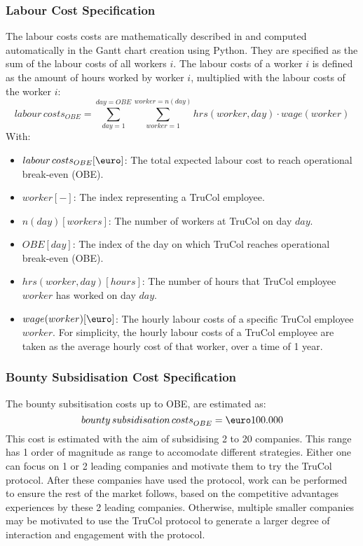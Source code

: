 \subsubsection{Labour Cost Specification}\label{subsubsec:labour_cost_specification}
The labour costs costs are mathematically described in  and computed automatically in the Gantt chart creation using Python. They are specified as the sum of the labour costs of all workers $i$. The labour costs of a worker $i$ is defined as the amount of hours worked by worker $i$, multiplied with the labour costs of the worker $i$:
\begin{equation}
	{labour\, costs}_{OBE}=\sum_{day=1}^{day=OBE} \sum_{worker=1} ^{worker=n(day)} hrs(worker,day)\cdot wage(worker)
	\label{eq:labour_costs}
\end{equation}
With:
\begin{itemize}
	\item ${labour\, costs}_{OBE} [\text{\euro}]$: The total expected labour cost to reach operational break-even (OBE).
	\item $worker [-]$: The index representing a TruCol employee.
	\item $n(day) [workers]$: The number of workers at TruCol on day $day$.
	\item $OBE [day]$: The index of the day on which TruCol reaches operational break-even  (OBE).
	\item $hrs(worker,day) [hours]$: The number of hours that TruCol employee $worker$ has worked on day $day$.
	\item $wage(worker) [\text{\euro}]$: The hourly labour costs of a specific TruCol employee $worker$. For simplicity, the hourly labour costs of a TruCol employee are taken as the average hourly cost of that worker, over a time of 1 year.
\end{itemize}

\subsubsection{Bounty Subsidisation Cost Specification}\label{subsubsec:bounty_subsidisation_cost_specification}
The bounty subsitisation costs up to OBE, are estimated as:
\begin{equation}
	{bounty\, subsidisation\, costs}_{OBE}=\text{\euro}100.000
	\label{eq:bounty_subsidisation}
\end{equation}
This cost is estimated with the aim of subsidising 2 to 20 companies. This range has 1 order of magnitude as range to accomodate different strategies. Either one can focus on 1 or 2 leading companies and motivate them to try the TruCol protocol. After these companies have used the protocol, work can be performed to ensure the rest of the market follows, based on the competitive advantages experiences by these 2 leading companies. Otherwise, multiple smaller companies may be motivated to use the TruCol protocol to generate a larger degree of interaction and engagement with the protocol.

